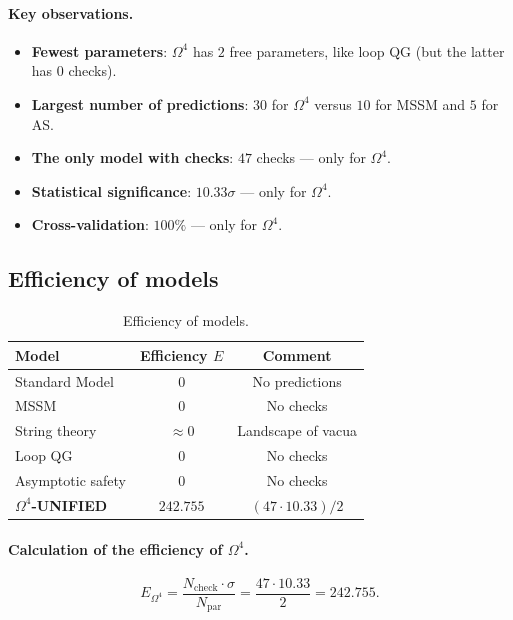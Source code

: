 \documentclass[11pt,a4paper]{article}
\newcommand{\Om}{\Omega^4}
\theoremstyle{definition}
\begin{document}
\paragraph{Key observations.}
\begin{itemize}
    \item \textbf{Fewest parameters}: 
          $\Om$ has $2$ free parameters, like loop QG 
          (but the latter has 0 checks).
    \item \textbf{Largest number of predictions}: 
          $30$ for $\Om$ versus $10$ for MSSM and $5$ for AS.
    \item \textbf{The only model with checks}: 
          $47$ checks — only for $\Om$.
    \item \textbf{Statistical significance}: 
          $10.33\sigma$ — only for $\Om$.
    \item \textbf{Cross-validation}: 
          $100\%$ — only for $\Om$.
\end{itemize}

\subsection{Efficiency of models}
\label{subsec:benchmark-efficiency}

\begin{table}[htbp]
\centering
\caption{Efficiency of models.}
\label{tab:benchmark-efficiency}
\begin{tabular}{lcc}
\toprule
Model & Efficiency $E$ & Comment \\
\midrule
Standard Model & $0$ & No predictions \\
MSSM & $0$ & No checks \\
String theory & $\approx 0$ & Landscape of vacua \\
Loop QG & $0$ & No checks \\
Asymptotic safety & $0$ & No checks \\
\midrule
\textbf{$\Om$-UNIFIED} & $\mathbf{242.755}$ & 
    $(47 \cdot 10.33)/2$ \\
\bottomrule
\end{tabular}
\end{table}

\paragraph{Calculation of the efficiency of $\Om$.}
\begin{equation}
    E_{\Om} = \frac{N_{\text{check}} \cdot \sigma}{N_{\text{par}}}
    = \frac{47 \cdot 10.33}{2} = 242.755.
\end{equation}
\end{document}
